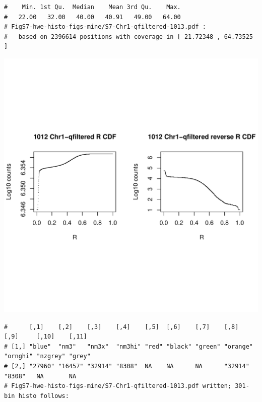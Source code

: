 \documentclass{article}\usepackage[]{graphicx}\usepackage[]{color}
\makeatletter
\def\maxwidth{ %
  \ifdim\Gin@nat@width>\linewidth
    \linewidth
  \else
    \Gin@nat@width
  \fi
}
\newenvironment{kframe}{%
 \def\at@end@of@kframe{}%
 \ifinner\ifhmode%
  \def\at@end@of@kframe{\end{minipage}}%
  \begin{minipage}{\columnwidth}%
 \fi\fi%
 \def\FrameCommand##1{\hskip\@totalleftmargin \hskip-\fboxsep
 \colorbox{shadecolor}{##1}\hskip-\fboxsep
     \hskip-\linewidth \hskip-\@totalleftmargin \hskip\columnwidth}%
 \MakeFramed {\advance\hsize-\width
   \@totalleftmargin\z@ \linewidth\hsize
   \@setminipage}}%
 {\par\unskip\endMakeFramed%
 \at@end@of@kframe}
\newenvironment{knitrout}{}{} %
\makeatother
\begin{document}
\begin{knitrout}
\begin{kframe}
\begin{verbatim}
#    Min. 1st Qu.  Median    Mean 3rd Qu.    Max. 
#   22.00   32.00   40.00   40.91   49.00   64.00 
# FigS7-hwe-histo-figs-mine/S7-Chr1-qfiltered-1013.pdf :
#   based on 2396614 positions with coverage in [ 21.72348 , 64.73525 ]
\end{verbatim}
\end{kframe}
\includegraphics[width=\maxwidth]{FigS7-hwe-histo-figs-knitr/unnamed-chunk-10-46} 
\begin{kframe}\begin{verbatim}
#      [,1]    [,2]    [,3]    [,4]    [,5]  [,6]    [,7]    [,8]     [,9]     [,10]    [,11] 
# [1,] "blue"  "nm3"   "nm3x"  "nm3hi" "red" "black" "green" "orange" "ornghi" "nzgrey" "grey"
# [2,] "27960" "16457" "32914" "8308"  NA    NA      NA      "32914"  "8308"   NA       NA    
# FigS7-hwe-histo-figs-mine/S7-Chr1-qfiltered-1013.pdf written; 301-bin histo follows:
\end{verbatim}
\end{kframe}

\end{knitrout}
\end{document}
